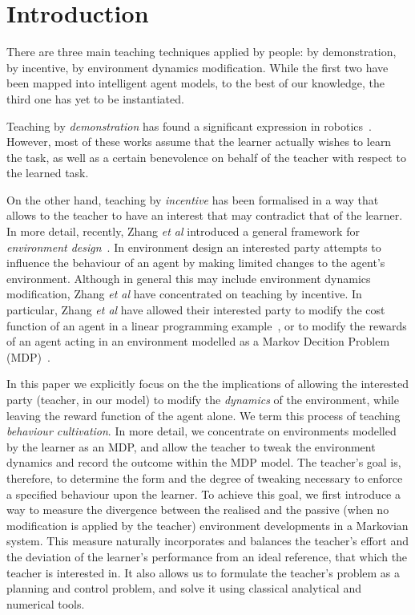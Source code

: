 

\section{Introduction}

There are three main teaching techniques applied by people: by
demonstration, by incentive, by environment dynamics
modification. While the
first two have been mapped into intelligent agent models, to the best
of our knowledge, the third one has yet to be instantiated.

Teaching by {\em demonstration} has found a significant expression in
robotics~\cite{argal_etal_2009}. However, most of these works assume
that the learner actually wishes to learn the task, as well as a
certain benevolence on behalf of the teacher with respect to the
learned task.

On the other hand, teaching by {\em incentive} has been formalised in a way
that allows to the teacher to have an interest that may contradict
that of the learner. In more detail, recently, Zhang \emph{et al}
introduced a general framework for \emph{environment
  design}~\cite{Zhang09:General}. In environment design an interested
party attempts to influence the behaviour of an agent by making limited
changes to the agent's environment. Although in general this may
include environment dynamics modification, Zhang \emph{et al} have
concentrated on teaching by incentive. In particular, Zhang \emph{et
  al} have allowed their interested party to modify the cost function
of an agent in a linear programming example~\cite{Zhang09:General}, or
to modify the rewards of an agent acting in an environment modelled as
a Markov Decition Problem (MDP)~\cite{zhang_parkes_2008,Zhang09:Policy}.

In this paper we explicitly focus on the the implications of allowing
the interested party (teacher, in our model) to modify the
\emph{dynamics} of the environment, while leaving the reward function
of the agent alone. We term this process of teaching {\em behaviour
  cultivation}. In more detail, we concentrate on environments
modelled by the learner as an MDP, and allow the teacher to tweak the
environment dynamics and record the outcome within the MDP model. The
teacher's goal is, therefore, to determine the form and the degree of
tweaking necessary to enforce a specified behaviour upon the
learner. To achieve this goal, we first introduce a way to measure the
divergence between the realised and the passive (when no modification
is applied by the teacher) environment developments in a Markovian
system. This measure naturally incorporates and balances the teacher's
effort and the deviation of the learner's performance from an ideal
reference, that which the teacher is interested in. It also allows us
to formulate the teacher's problem as a planning and control problem,
and solve it using classical analytical and numerical tools.

